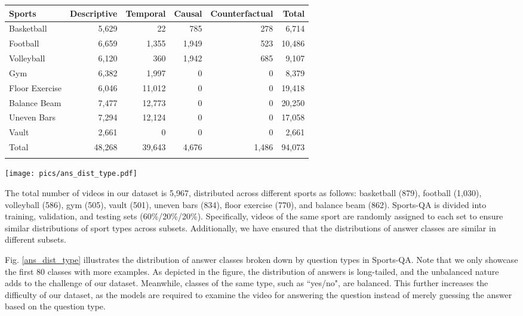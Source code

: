 {\begin{table}[tbp]
\begin{tabular}{@{}lrrrrr@{}}
\toprule
 Sports       & Descriptive & Temporal & Causal & Counterfactual & Total  \\ \midrule
Basketball & 5,629 & 22    & 785    & 278      & 6,714  \\
Football   & 6,659 & 1,355 & 1,949  & 523      & 10,486 \\
Volleyball & 6,120 & 360   & 1,942  & 685      & 9,107  \\
Gym     & 6,382 & 1,997 & 0      & 0        & 8,379  \\
Floor Exercise      &  6,046      &  11,012     & 0      & 0        &   19,418     \\
Balance Beam       &   7,477     &   12,773    & 0      & 0        &   20,250     \\
Uneven Bars      &   7,294     &   12,124    & 0      & 0        &    17,058    \\
Vault      &   2,661     &   0    & 0      & 0       &   2,661     \\ \midrule
Total   &   48,268     &   39,643    & 4,676  & 1,486    &    94,073    \\ \botrule
\end{tabular}
\end{table}

\begin{figure*}[tbp]
\texttt{[image: pics/ans\_dist\_type.pdf]}
\caption{The distributions of answer classes broken down by question types.}
\label{ans_dist_type}
\end{figure*}



The total number of videos in our dataset is 5,967, distributed across different sports as follows: basketball (879), football (1,030), volleyball (586), gym (505), vault (501), uneven bars (834), floor exercise (770), and balance beam (862). Sports-QA is divided into training, validation, and testing sets (60\%/20\%/20\%). Specifically, videos of the same sport are randomly assigned to each set to ensure similar distributions of sport types across subsets. Additionally, we have ensured that the distributions of answer classes are similar in different subsets.

Fig. \ref{ans_dist_type} illustrates the distribution of answer classes broken down by question types in Sports-QA. Note that we only showcase the first 80 classes with more examples. As depicted in the figure, the distribution of answers is long-tailed, and the unbalanced nature adds to the challenge of our dataset. Meanwhile, classes of the same type, such as ``yes/no", are balanced. This further increases the difficulty of our dataset, as the models are required to examine the video for answering the question instead of merely guessing the answer based on the question type. 



}
